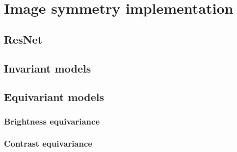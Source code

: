 \section{Image symmetry implementation}

\subsection{ResNet}
\subsection{Invariant models}
\subsection{Equivariant models}
    \subsubsection{Brightness equivariance}
    \subsubsection{Contrast equivariance}


